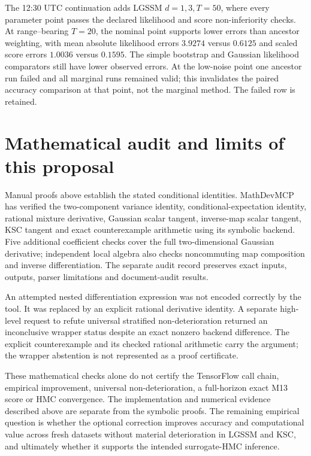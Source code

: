 \documentclass[11pt]{article}
\begin{document}
The 12:30 UTC continuation adds LGSSM $d=1,3,T=50$, where every
parameter point passes the declared likelihood and score non-inferiority
checks. At range--bearing $T=20$, the nominal point supports lower errors
than ancestor weighting, with mean absolute likelihood errors $3.9274$
versus $0.6125$ and scaled score errors $1.0036$ versus $0.1595$.
The simple bootstrap and Gaussian likelihood comparators still have lower
observed errors. At the low-noise point one ancestor run failed and all
marginal runs remained valid; this invalidates the paired accuracy comparison
at that point, not the marginal method. The failed row is retained.

\section{Mathematical audit and limits of this proposal}

Manual proofs above establish the stated conditional identities. MathDevMCP
has verified the two-component variance identity, conditional-expectation
identity, rational mixture derivative, Gaussian scalar tangent,
inverse-map scalar tangent, KSC tangent and exact counterexample arithmetic
using its symbolic backend. Five additional coefficient checks cover the
full two-dimensional Gaussian derivative; independent local algebra also
checks noncommuting map composition and inverse differentiation.
The separate audit record preserves exact
inputs, outputs, parser limitations and document-audit results.

An attempted nested differentiation expression was not encoded correctly by
the tool. It was replaced by an explicit rational derivative identity.
A separate high-level request to refute universal stratified
non-deterioration returned an inconclusive wrapper status despite an
exact nonzero backend difference. The explicit counterexample and its
checked rational arithmetic carry the argument; the wrapper abstention
is not represented as a proof certificate.

These mathematical checks alone do not certify the TensorFlow call chain,
empirical improvement, universal non-deterioration, a full-horizon exact
M13 score or HMC convergence. The implementation and numerical evidence
described above are separate from the symbolic proofs. The remaining empirical
question is whether the optional correction improves accuracy and computational
value across fresh datasets without material deterioration in LGSSM and KSC,
and ultimately whether it supports the intended surrogate-HMC inference.
\end{document}
